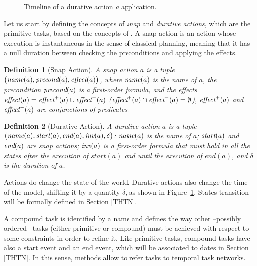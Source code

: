 \documentclass[letterpaper]{article} %
\newtheorem{definition}{Definition}
\newcommand{\name}{\text{\it name}}
\newcommand{\pre}{\text{\it precond}}
\newcommand{\effect}{\text{\it effect}}
\newcommand{\add}{\text{\it effect}^{+}}
\newcommand{\del}{\text{\it effect}^{-}}
\newcommand{\tstart}{\text{\it start}}
\newcommand{\tend}{\text{\it end}}
\newcommand{\tinv}{\text{\it inv}}
\begin{document}
\begin{figure}
\caption{Timeline of a durative action \emph{a} application.\label{fig:timeline} \vspace{-6mm}}
\end{figure}


 Let us start by defining the concepts of {\it snap} and {\it durative actions}, which are the primitive tasks, based on the concepts of \cite{abdulaziz22}. A snap action is an action whose execution is instantaneous in the sense of classical planning, meaning that it has a null duration %
 between checking the preconditions and applying the effects. %
 \begin{definition}[Snap Action]\label{def:snap} A \emph{snap action} $a$ is a tuple $\bigl(\name(a), \pre(a), \effect(a) \bigr)$, where $\name(a)$ is the name of $a$, the precondition $\pre(a)$ is a first-order formula, %
   and the effects $\effect(a) = \add(a) \cup \del(a)$ ($\add(a) \cap \del(a) = \emptyset$), $\add(a)$ and $\del(a)$ are conjunctions of predicates. 

\end{definition}

\begin{definition}[Durative Action]\label{def:dur}
  A \emph{durative action} $a$ is a tuple $\bigl(\name(a), \tstart(a), \tend(a), \tinv(a), \delta\bigr)$: $\name(a)$ is the name of $a$; $\tstart(a)$ and $\tend(a)$ are snap actions; $\tinv(a)$ is a first-order formula that must hold in all the states after the execution of $start(a)$ and until the execution of $end(a)$, %
  and $\delta$ is the duration of $a$. %
\end{definition}
Actions do change the state of the world. Durative actions also change the time of the model, shifting it by a quantity $\delta$, as shown in Figure~\ref{fig:timeline}.
States transition will be formally defined in Section \ref{THTN}.  %

A compound task is identified by a name and defines the way other --possibly ordered-- tasks (either primitive or compound) must be achieved with respect to some constraints in order to refine it.
 Like primitive tasks, compound tasks have also a start event and an end event, which will be associated to dates in Section \ref{THTN}. %
In this sense, methods allow to refer tasks to temporal task networks.
\end{document}

